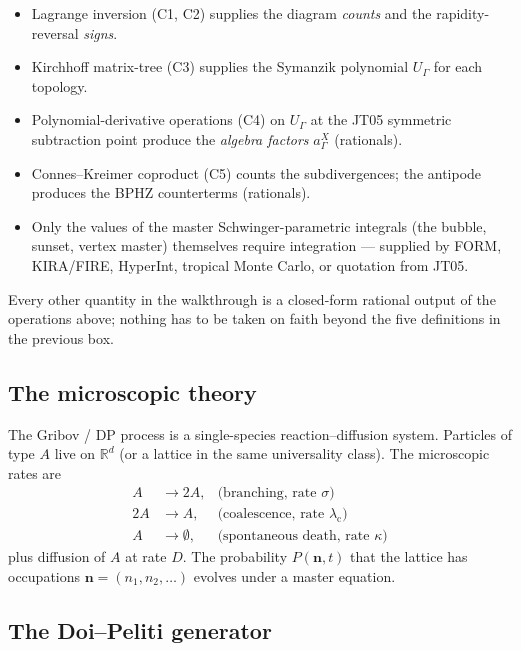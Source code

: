 \documentclass[11pt,a4paper]{article}
\theoremstyle{definition}
\theoremstyle{plain}
\begin{document}
\begin{cfacbox}
\begin{itemize}[leftmargin=2em]
  \item Lagrange inversion (\textsf{C1}, \textsf{C2}) supplies the
    diagram \emph{counts} and the rapidity-reversal \emph{signs}.
  \item Kirchhoff matrix-tree (\textsf{C3}) supplies the Symanzik
    polynomial $U_\Gamma$ for each topology.
  \item Polynomial-derivative operations (\textsf{C4}) on $U_\Gamma$
    at the JT05 symmetric subtraction point produce the
    \emph{algebra factors} $a^X_\Gamma$ (rationals).
  \item Connes--Kreimer coproduct (\textsf{C5}) counts the subdivergences;
    the antipode produces the BPHZ counterterms (rationals).
  \item Only the values of the master Schwinger-parametric integrals
    (the bubble, sunset, vertex master) themselves require
    integration --- supplied by FORM, KIRA/FIRE, HyperInt, tropical
    Monte Carlo, or quotation from JT05.
\end{itemize}
Every other quantity in the walkthrough is a closed-form rational
output of the operations above; nothing has to be taken on faith
beyond the five definitions in the previous box.
\end{cfacbox}

\subsection{The microscopic theory}\label{app:micro}

The Gribov / DP process is a single-species reaction--diffusion
system.  Particles of type $A$ live on $\mathbb{R}^d$ (or a lattice in
the same universality class).  The microscopic rates are
\begin{align}
  A & \to 2A, & \text{(branching, rate } \sigma\text{)}\label{eq:micro-branch}\\
  2A & \to A, & \text{(coalescence, rate } \lambda_{\text{c}}\text{)}\label{eq:micro-coal}\\
  A & \to \emptyset, & \text{(spontaneous death, rate } \kappa\text{)}\label{eq:micro-death}
\end{align}
plus diffusion of $A$ at rate $D$.  The probability $P(\mathbf n, t)$
that the lattice has occupations $\mathbf n = (n_1, n_2, \ldots)$
evolves under a master equation.

\subsection{The Doi--Peliti generator}\label{app:doi-peliti}
\end{document}
